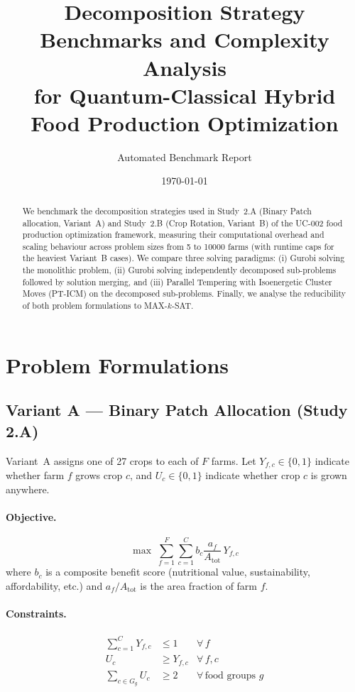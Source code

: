 \documentclass[11pt,a4paper]{article}
\title{Decomposition Strategy Benchmarks and Complexity Analysis\\
for Quantum-Classical Hybrid Food Production Optimization}
\author{Automated Benchmark Report}
\date{\today}
\begin{document}
\maketitle

\begin{abstract}
We benchmark the decomposition strategies used in Study~2.A (Binary Patch allocation,
Variant~A) and Study~2.B (Crop Rotation, Variant~B) of the UC-002 food production
optimization framework, measuring their computational overhead and scaling behaviour
across problem sizes from 5 to 10000 farms (with runtime caps for the heaviest
Variant~B cases). We compare three solving paradigms:
(i) Gurobi solving the monolithic problem, (ii) Gurobi solving independently
decomposed sub-problems followed by solution merging, and (iii) Parallel Tempering
with Isoenergetic Cluster Moves (PT-ICM) on the decomposed sub-problems. Finally,
we analyse the reducibility of both problem formulations to MAX-$k$-SAT.
\end{abstract}

\tableofcontents
\newpage

\section{Problem Formulations}
\label{sec:formulations}

\subsection{Variant A --- Binary Patch Allocation (Study 2.A)}
\label{sec:varA}

Variant~A assigns one of 27 crops to each of $F$ farms.  Let $Y_{f,c}\in\{0,1\}$
indicate whether farm $f$ grows crop $c$, and $U_c\in\{0,1\}$ indicate whether
crop $c$ is grown anywhere.

\paragraph{Objective.}
\begin{equation}
\max \;\sum_{f=1}^{F}\sum_{c=1}^{C} b_c \frac{a_f}{A_{\mathrm{tot}}} \, Y_{f,c}
\label{eq:obj-A}
\end{equation}
where $b_c$ is a composite benefit score (nutritional value, sustainability,
affordability, etc.) and $a_f/A_{\mathrm{tot}}$ is the area fraction of farm $f$.

\paragraph{Constraints.}
\begin{align}
\sum_{c=1}^{C} Y_{f,c} &\le 1 & \forall\, f  \label{eq:one-crop}\\
U_c &\ge Y_{f,c} & \forall\, f,c  \label{eq:link}\\
\sum_{c\in G_g} U_c &\ge 2 & \forall\,\text{food groups } g  \label{eq:diversity}
\end{align}
\end{document}

